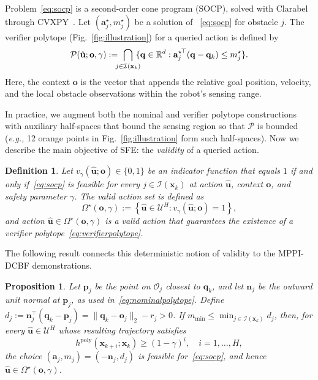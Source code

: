 \documentclass[letterpaper, 10 pt, conference]{ieeeconf}
\newcommand{\n}{\mathbf{n}}
\newcommand{\p}{\mathbf{p}}
\newcommand{\q}{\mathbf{q}}
\renewcommand{\o}{\mathbf{o}}
\newcommand{\qk}{\mathbf{\q}_{k}}
\newcommand{\xk}{\mathbf{x}_{k}}
\newcommand{\xki}{\mathbf{x}_{k+i}}
\newcommand{\aj}{\mathbf{a}_{j}}
\newcommand{\oj}{\mathbf{o}_{j}}
\newtheorem{proposition}{Proposition}
\newtheorem{definition}{Definition}
\newcommand{\nspace}[1]{\mkern#1mu}
\begin{document}
Problem~\eqref{eq:socp} is a second-order cone program (SOCP), solved with Clarabel through CVXPY~\cite{goulart2026clarabel}. 
Let $(\aj^\star,m_j^\star)$ be a solution of ~\eqref{eq:socp} for obstacle $j$. The verifier polytope (Fig.~\ref{fig:illustration}) for a queried action is defined by
\begin{equation}
\mathcal P(\hat{\mathbf u};\o,\gamma):=\nspace{-10}\bigcap_{j\in\mathcal I(\xk)}\nspace{-10}\{
\q\in\mathbb R^d:
{\aj^\star}^{\!\top}(\q-\qk)\le m_j^\star\}.
\label{eq:verifierpolytope}
\end{equation}
Here, the context $\o$ is the vector that appends the relative goal position, velocity, and the local obstacle observations within the robot's sensing range.

In practice, we augment both the nominal and verifier polytope constructions with auxiliary half-spaces that bound the sensing region so that $\mathcal P$ is bounded (\textit{e.g.,} 12 orange points in Fig.~\ref{fig:illustration} form such half-spaces).
Now we describe the main objective of SFE: the \textit{validity} of a queried action.

\begin{definition}
\label{def:verifier}
Let \(v_\gamma(\hat{\mathbf u};\o) \in \{0, 1\}\) be an indicator function that equals $1$ if and only if~\eqref{eq:socp} is feasible for \emph{every} $j\in\mathcal I(\xk)$ at action $\hat{\mathbf u}$, context $\o$, and safety parameter $\gamma$.
The \textit{valid action set} is defined as
\begin{equation}
    \Omega^\star(\o,\gamma)
    :=
    \left\{
    \hat{\mathbf u}\in\mathcal U^H:
    v_\gamma(\hat{\mathbf u};\o)=1
    \right\},
    \label{eq:verifier-certified-set}
\end{equation}
and action \(\hat{\mathbf u} \in \Omega^\star(\o,\gamma)\) is a \textit{valid} action that guarantees the existence of a verifier polytope~\eqref{eq:verifierpolytope}.
\end{definition}

The following result connects this deterministic notion of validity to the MPPI-DCBF demonstrations.

\begin{proposition}
\label{prop:nominal-verifier}
Let $\p_j$ be the point on $\mathcal O_j$ closest to $\qk$, and let $\n_j$ be the outward unit normal at $\p_j$, as used in~\eqref{eq:nominalpolytope}. Define $d_j\!:=\!\n_j^\top(\qk\!-\!\p_j)\!=\!\|\qk\!-\!\oj\|_2\!-\!r_j\!>\!0$.
If $m_{\min}\le\min_{j\in\mathcal I(\xk)}d_j$, then, for every
$\hat{\mathbf u}\in\mathcal U^H$ whose resulting trajectory satisfies
\[
h^{\mathrm{poly}}(\xki;\xk)\ge(1-\gamma)^i,
\quad i=1,\ldots,H,
\]
the choice $(\aj,m_j)=(-\n_j,d_j)$ is feasible
for~\eqref{eq:socp}, and hence
$\hat{\mathbf u}\in\Omega^\star(\o,\gamma)$.
\end{proposition}
\end{document}
